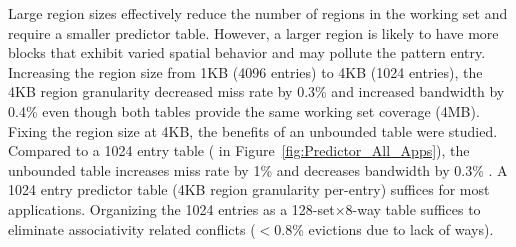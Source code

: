 {{Large region sizes effectively reduce the number of regions in the working set and require a smaller predictor table. However, a larger region is likely to have more blocks that exhibit varied spatial behavior and may pollute the pattern entry.  Increasing the region size from 1KB (4096 entries) to 4KB (1024 entries), the 4KB region granularity decreased miss rate by 0.3\% and increased bandwidth by 0.4\% even though both tables provide the same working set coverage (4MB).  Fixing the region size at 4KB, the benefits of an unbounded table were studied.  Compared to a 1024 entry table ( in Figure~\ref{fig:Predictor_All_Apps}), the unbounded table increases miss rate by 1\% and decreases bandwidth by 0.3\% . A 1024 entry predictor table (4KB region granularity per-entry) suffices for most applications. Organizing the 1024 entries as a 128-set$\times$8-way table suffices to eliminate associativity related conflicts ($<$0.8\% evictions due to lack of ways).

\begin{figure}[h]
  \centering
    

\end{figure}}}
